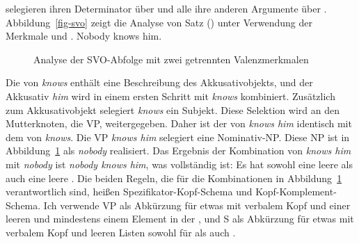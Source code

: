 selegieren ihren Determinator über \spr und alle ihre anderen Argumente über \comps. Abbildung~\vref{fig-svo}
zeigt die Analyse von Satz () unter Verwendung der Merkmale \spr und \comps.
\ea
Nobody knows him.
\z
\begin{figure}
\caption{\label{fig-svo}Analyse der SVO-Abfolge mit zwei getrennten Valenzmerkmalen}
\end{figure}
Die \compsl von \emph{knows} enthält eine Beschreibung des Akkusativobjekts, und der Akkusativ
\emph{him} wird in einem ersten Schritt mit \emph{knows} kombiniert. Zusätzlich zum Akkusativobjekt
selegiert \emph{knows} ein Subjekt. Diese Selektion wird an den Mutterknoten, die VP, weitergegeben. Daher ist
der \sprw von \emph{knows him} identisch mit dem \sprw von \emph{knows}. Die VP \emph{knows him}
selegiert eine Nominativ-NP. Diese NP ist in Abbildung~\ref{fig-svo} als \emph{nobody} realisiert. Das
Ergebnis der Kombination von \emph{knows him} mit \emph{nobody} ist \emph{nobody knows him}, was
vollständig ist: Es hat sowohl eine leere \sprl als auch eine leere \compsl. Die beiden Regeln, die für
die Kombinationen in Abbildung~\ref{fig-svo} verantwortlich sind, heißen Spezifikator-Kopf-Schema und
Kopf-Komplement-Schema. Ich verwende VP als Abkürzung für etwas mit verbalem Kopf und einer leeren \compsl und mindestens
einem Element in der \sprl, und S als Abkürzung für etwas mit verbalem Kopf und leeren Listen sowohl
für \spr als auch \compsw.

